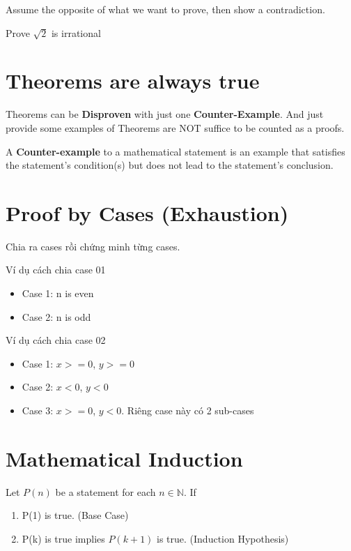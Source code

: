 Assume the opposite of what we want to prove, then show a contradiction.

Prove $\sqrt{2}$ is irrational

\section{Theorems are always true}

Theorems can be \textbf{Disproven} with just one \textbf{Counter-Example}. And just provide some examples of Theorems are NOT suffice to be counted as a proofs.

A \textbf{Counter-example} to a mathematical statement is an example that satisfies the statement's condition(s) but does not lead to the statement's conclusion.

\section{Proof by Cases (Exhaustion)}

Chia ra cases rồi chứng minh từng cases.

Ví dụ cách chia case 01

\begin{itemize}
  \item Case 1: n is even
  \item Case 2: n is odd
\end{itemize}

Ví dụ cách chia case 02

\begin{itemize}
  \item Case 1: $x>=0$, $y>=0$
  \item Case 2: $x<0$, $y<0$
  \item Case 3: $x>=0$, $y<0$. Riêng case này có 2 sub-cases
\end{itemize}

\section{Mathematical Induction}

Let $P(n)$ be a statement for each $n \in \mathbb{N}$. If

\begin{enumerate}
  \item P(1) is true. (Base Case)
  \item P(k) is true implies $P(k+1)$ is true. (Induction Hypothesis)
\end{enumerate}

